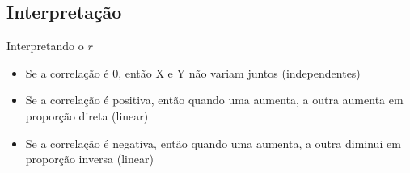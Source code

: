 \documentclass{beamer}
\begin{document}

    

    


\subsection{Interpretação}

\begin{frame}{Interpretando o $r$}
  \begin{itemize}
  \item Se a correlação é 0, então X e Y não variam juntos (independentes)
  \item Se a correlação é positiva, então quando uma aumenta, a outra
    aumenta em proporção direta (linear)
  \item Se a correlação é negativa, então quando uma aumenta, a outra
    diminui em proporção inversa (linear)
  \end{itemize}
\end{frame}
\end{document}
